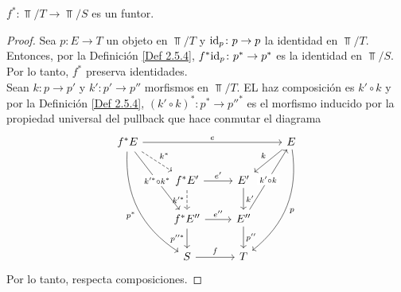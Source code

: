 \begin{lema}\label{Lem 2.5.6}
$f^*\colon \Top/T\to \Top/S$ es un funtor.
\end{lema}

\begin{proof}
Sea $p\colon E\to T$ un objeto en $\Top/T$ y ${\mathrm{id}}_p\colon p\to p$ la identidad en $\Top/T$. Entonces, por la Definición \ref{Def 2.5.4}, $f^*{\mathrm{id}}_p\colon p^*\to p^*$ es la identidad en $\Top/S$. Por lo tanto, $f^*$ preserva identidades.\\

Sean $k\colon p\to p'$ y $k'\colon p'\to p''$ morfismos en $\Top/T$. EL haz composición es $k'\circ k$ y por la Definición \ref{Def 2.5.4}, $(k'\circ k)^*\colon p^*\to p''^*$ es el morfismo inducido por la propiedad universal del pullback que hace conmutar el diagrama
\[\begin{tikzcd}
f^*E \arrow[rrr, "e"] \arrow[rd, "k^*", dashed] \arrow[rdd, "k'^* \circ k^*" description] \arrow[rddd, "p^*"', bend right] &                                                  &                                                           & E \arrow[ld, "k"'] \arrow[lddd, "p", bend left] \\
                                                                                                                           & f^*E' \arrow[d, "k'^*"', dashed] \arrow[r, "e'"] & E' \arrow[d, "k'"]                                        &                                                 \\
                                                                                                                           & f^*E'' \arrow[d, "p''^*"'] \arrow[r, "e''"]      & E'' \arrow[d, "p''"] \arrow[ruu, "k'\circ k" description] &                                                 \\
                                                                                                                           & S \arrow[r, "f"]                                 & T                                                         &                                                
\end{tikzcd}\]
Por lo tanto, respecta composiciones.
\end{proof}
